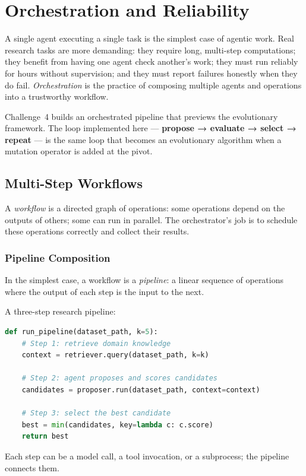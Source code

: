 \chapter{Orchestration and Reliability}
\label{chapter:Orchestration}

A single agent executing a single task is the simplest case of agentic work.
Real research tasks are more demanding: they require long, multi-step computations; they benefit from having one agent check another's work; they must run reliably for hours without supervision; and they must report failures honestly when they do fail.
\emph{Orchestration} is the practice of composing multiple agents and operations into a trustworthy workflow.

Challenge~4 builds an orchestrated pipeline that previews the evolutionary framework.
The loop implemented here — \textbf{propose → evaluate → select → repeat} — is the same loop that becomes an evolutionary algorithm when a mutation operator is added at the pivot.

\section{Multi-Step Workflows}
\label{section:MultiStepWorkflows}

A \emph{workflow} is a directed graph of operations: some operations depend on the outputs of others; some can run in parallel.
The orchestrator's job is to schedule these operations correctly and collect their results.

\subsection{Pipeline Composition}

In the simplest case, a workflow is a \emph{pipeline}: a linear sequence of operations where the output of each step is the input to the next.

\begin{example}
A three-step research pipeline:
\begin{lstlisting}[language=python]
def run_pipeline(dataset_path, k=5):
    # Step 1: retrieve domain knowledge
    context = retriever.query(dataset_path, k=k)

    # Step 2: agent proposes and scores candidates
    candidates = proposer.run(dataset_path, context=context)

    # Step 3: select the best candidate
    best = min(candidates, key=lambda c: c.score)
    return best
\end{lstlisting}
Each step can be a model call, a tool invocation, or a subprocess; the pipeline connects them.
\end{example}

